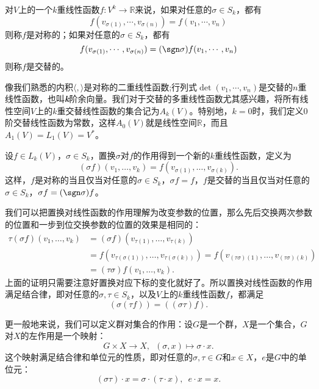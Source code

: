     \begin{definition}[对称与交替]
        对\(V\)上的一个\(k\)重线性函数\(f\colon V^k\to\mathbb{R}\)来说，如果对任意的\(\sigma\in S_k\)，都有\[f(v_{\sigma(1)},\cdots,v_{\sigma(n)})=f(v_1,\cdots,v_n)\]则称\(f\)是{\heiti 对称}的；如果对任意的\(\sigma\in S_k\)，都有\[ f(v_{\sigma(1)},\cdots,v_{\sigma(n)})=(\sgn \sigma)f(v_1,\cdots,v_n)\]则称\(f\)是{\heiti 交替}的。
    \end{definition}

    像我们熟悉的内积\(\langle,\rangle\)是对称的二重线性函数;行列式\(\det(v_1,\cdots,v_n)\)是交替的\(n\)重线性函数，也叫\textbf{\textit{k}}{\heiti 阶余向量}。我们对于交替的多重线性函数尤其感兴趣，将所有线性空间\(V\)上的\(k\)重交替线性函数的集合记为\(A_k(V)\)。特别地，\enspace\(k=0\)时，我们定义\(0\)阶交替线性函数为常数，这样\(A_0(V)\)就是线性空间\(\mathbb{R}\)，而且\(A_1(V) = L_1(V) = V^*\)。
    

    设\(f\in L_k(V)\)，\enspace\(\sigma\in S_k\)，置换\(\sigma\)对\(f\)的{\heiti 作用}得到一个新的\(k\)重线性函数，定义为\[(\sigma f)(v_1,\dots,v_k) = f(v_{\sigma(1)},\dots,v_{\sigma(k)}).\]
    这样，\enspace\(f\)是对称的当且仅当对任意的\(\sigma\in S_k\)，\enspace\(\sigma f=f\)，\enspace\(f\)是交替的当且仅当对任意的\(\sigma\in S_k\)，\enspace\(\sigma f=(\sgn \sigma)f\)。

    我们可以把置换对线性函数的作用理解为改变参数的位置，那么先后交换两次参数的位置和一步到位交换参数的位置的效果是相同的：
    \begin{equation*}
        \begin{split}
            \tau(\sigma f)(v_1,\dots,v_k) &= (\sigma f)(v_{\tau(1)},\dots,v_{\tau(k)})\\
            &= f(v_{\tau(\sigma(1))},\dots,v_{\tau(\sigma(k))}) = f(v_{(\tau\sigma)(1)},\dots,v_{(\tau\sigma)(k)})\\
            &= (\tau\sigma)f(v_1,\dots,v_k).
        \end{split}
    \end{equation*}
    上面的证明只需要注意好置换对应下标的变化就好了。所以置换对线性函数的作用满足结合律，即对任意的\(\sigma, \tau\in S_k\)，以及\(V\)上的\(k\)重线性函数\(f\)，都满足\[(\sigma(\tau f)) = ((\sigma\tau)f).\]

    更一般地来说，我们可以定义群对集合的作用：设\(G\)是一个群，\(X\)是一个集合，\enspace\(G\)对\(X\)的{\heiti 左作用}是一个映射：\[G\times X\to X,\enspace(\sigma,x)\mapsto\sigma\cdot x.\]
    这个映射满足结合律和单位元的性质，即对任意的\(\sigma, \tau\in G\)和\(x\in X\)，\enspace$e$是\(G\)中的单位元：\[(\sigma\tau)\cdot x = \sigma\cdot(\tau\cdot x),\enspace e\cdot x = x.\]
    
